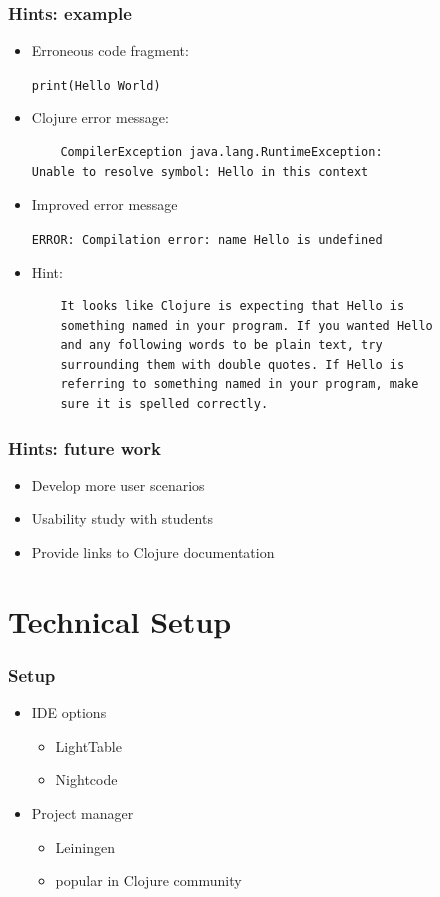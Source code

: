 \documentclass{beamer}
\begin{document}
\begin{frame}[fragile]
\frametitle{Hints: example}

	\begin{itemize}
		\item Erroneous code fragment:
		
			\texttt{print(Hello World)}

		\item Clojure error message:
		
  			 \begin{verbatim}
	CompilerException java.lang.RuntimeException:
Unable to resolve symbol: Hello in this context
			\end{verbatim}
			
		\item Improved error message
		
			\textcolor{PrettyGreen}{
			\texttt{ERROR: Compilation error: name Hello is undefined}}
			
		\item Hint:
		
			\begin{verbatim}
	It looks like Clojure is expecting that Hello is
	something named in your program. If you wanted Hello
	and any following words to be plain text, try
	surrounding them with double quotes. If Hello is
	referring to something named in your program, make
	sure it is spelled correctly.
			\end{verbatim}
	
	\end{itemize}
\end{frame}

\begin{frame}
\frametitle{Hints: future work}
	\begin{itemize}
  	 \item Develop more user scenarios
  	 \item Usability study with students
  	 \item Provide links to Clojure documentation
	 \end{itemize}
\end{frame}

\section{Technical Setup}

\begin{frame}
\frametitle{Setup}
	\begin{itemize}
		\item IDE options
		\begin{itemize}
			\item LightTable
			\item Nightcode
		\end{itemize}
		\item Project manager
		\begin{itemize}
			\item Leiningen
			\item popular in Clojure community
		\end{itemize}
	\end{itemize}
\end{frame}
\end{document}
